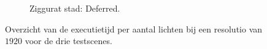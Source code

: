 \begin{figure}[t]
\begin{adjustbox}{minipage=\textwidth, scale=0.6}
  \end{adjustbox} %
  \begin{adjustbox}{minipage=\textwidth, scale=0.6}
    \begin{subfigure}[b]{0.83\textwidth}
      \centering
      \def\svgwidth{\textwidth}
      
      \caption{Ziggurat stad: Deferred.}
      \label{fig:ts-lights-deferred:city}
    \end{subfigure}
  \end{adjustbox}
  \caption{Overzicht van de executietijd per aantal lichten bij een resolutio
           van $1920$ voor de drie testscenes.}
  \label{fig:ts-lights}
\end{figure}

